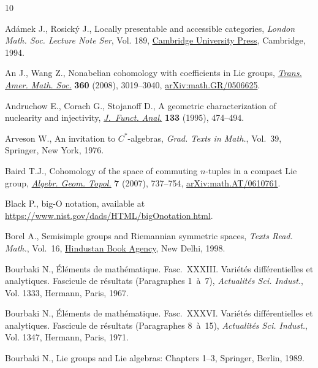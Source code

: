 \begin{thebibliography}{10}
\footnotesize\itemsep=0pt

Ad\'amek J., Rosick\'y J., Locally presentable and accessible categories,
 \textit{London Math. Soc. Lecture Note Ser}, Vol. 189, \href{https://doi.org/10.1017/CBO9780511600579}{Cambridge University
 Press}, Cambridge, 1994.

An J., Wang Z., Nonabelian cohomology with coefficients in {L}ie groups,
 \href{https://doi.org/10.1090/S0002-9947-08-04278-5}{\textit{Trans. Amer. Math. Soc.}} \textbf{360} (2008), 3019--3040,
 \href{https://arxiv.org/abs/math.GR/0506625}{arXiv:math.GR/0506625}.

Andruchow E., Corach G., Stojanoff D., A geometric characterization of
 nuclearity and injectivity, \href{https://doi.org/10.1006/jfan.1995.1134}{\textit{J.~Funct. Anal.}} \textbf{133} (1995),
 474--494.

Arveson W., An invitation to {$C^*$}-algebras, \textit{Grad. Texts in Math.},
 Vol.~39, Springer, New York, 1976.

Baird T.J., Cohomology of the space of commuting {$n$}-tuples in a compact
 {L}ie group, \href{https://doi.org/10.2140/agt.2007.7.737}{\textit{Algebr. Geom. Topol.}} \textbf{7} (2007), 737--754,
 \href{https://arxiv.org/abs/math.AT/0610761}{arXiv:math.AT/0610761}.

Black P., big-{O} notation, available at
 \url{https://www.nist.gov/dads/HTML/bigOnotation.html}.

Borel A., Semisimple groups and {R}iemannian symmetric spaces, \textit{Texts
 Read. Math.}, Vol.~16, \href{https://doi.org/10.1007/978-93-80250-92-2}{Hindustan Book Agency}, New Delhi, 1998.

Bourbaki N., \'El\'ements de math\'ematique. {F}asc.~{XXXIII}. {V}ari\'et\'es
 diff\'erentielles et analytiques. {F}ascicule de r\'esultats ({P}aragraphes
 1~\`a~7), \textit{Actualit\'es Sci. Indust.}, Vol. 1333, Hermann, Paris,
 1967.

Bourbaki N., \'El\'ements de math\'ematique. {F}asc.~{XXXVI}. {V}ari\'et\'es
 diff\'erentielles et analytiques. {F}ascicule de r\'esultats ({P}aragraphes
 8~\`a~15), \textit{Actualit\'es Sci. Indust.}, Vol. 1347, Hermann, Paris,
 1971.

Bourbaki N., Lie groups and {L}ie algebras: {C}hapters 1--3, Springer, Berlin,
 1989.


\end{thebibliography}
